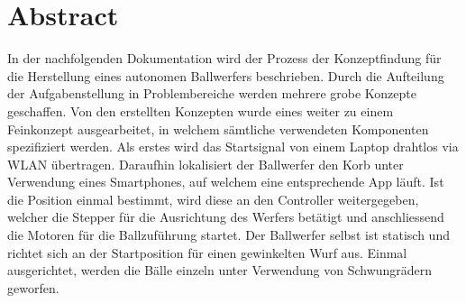\section*{Abstract}
In der nachfolgenden Dokumentation wird der Prozess der Konzeptfindung für die Herstellung eines autonomen Ballwerfers beschrieben. Durch die Aufteilung der Aufgabenstellung in Problembereiche werden mehrere grobe Konzepte geschaffen. Von den erstellten Konzepten wurde eines weiter zu einem Feinkonzept ausgearbeitet, in welchem sämtliche verwendeten Komponenten spezifiziert werden. Als erstes wird das Startsignal von einem Laptop drahtlos via WLAN übertragen. Daraufhin lokalisiert der Ballwerfer den Korb unter Verwendung eines Smartphones, auf welchem eine entsprechende App läuft. Ist die Position einmal bestimmt, wird diese an den Controller weitergegeben, welcher die Stepper für die Ausrichtung des Werfers betätigt und anschliessend die Motoren für die Ballzuführung startet. Der Ballwerfer selbst ist statisch und richtet sich an der Startposition für einen gewinkelten Wurf aus. Einmal ausgerichtet, werden die Bälle einzeln unter Verwendung von Schwungrädern geworfen.
